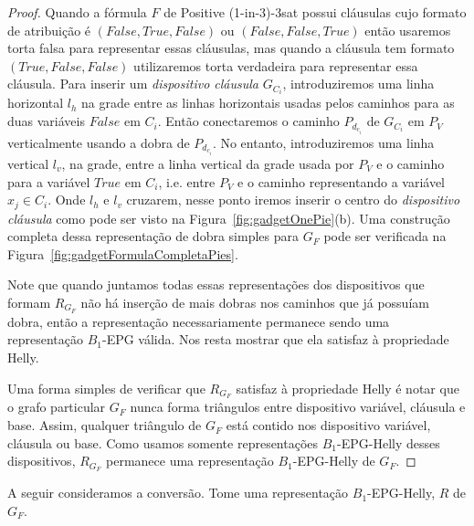 \begin{proof}
Quando a fórmula  $F$ de {\sc Positive (1-in-3)-3sat} possui cláusulas cujo formato de atribuição é $(False, True, False)$ ou $(False, False, True)$ então usaremos torta falsa para representar essas cláusulas, mas quando a cláusula tem formato  $(True, False, False)$ utilizaremos  torta verdadeira para representar essa cláusula. Para inserir um  \textit{ dispositivo cláusula} $G_{C_i}$, introduziremos uma linha horizontal $l_{h}$ na grade entre as linhas horizontais usadas pelos caminhos para as duas variáveis $False$ em $ C_i $. Então conectaremos o caminho $P_{d_{c_i}}$ de $G_{C_i}$ em $P_{V}$ verticalmente usando a dobra de  $P_{d_{c_i}}$. No entanto, introduziremos uma linha vertical $ l_{v}$, na grade, entre a linha vertical da grade usada por $P_{V}$ e o caminho para  a variável $True$ em $C_i$, i.e. entre $P_{V}$ e o caminho representando a variável  $x_j \in C_i$. Onde  $l_{h}$  e $l_{v}$ cruzarem, nesse ponto iremos inserir o centro do  \textit{dispositivo cláusula} como pode ser visto na Figura~\ref{fig:gadgetOnePie}(b). Uma construção completa dessa representação de dobra simples para  $G_F$ pode ser verificada na 
Figura~\ref{fig:gadgetFormulaCompletaPies}.%

\begin{landscape}

\end{landscape}





Note que quando juntamos todas essas representações  dos  dispositivos que formam $ R_{G_F} $ não há inserção de mais dobras nos caminhos que já possuíam dobra, então a representação necessariamente permanece sendo uma representação  $ B_1$-EPG válida. Nos resta mostrar que ela satisfaz à propriedade Helly. 

Uma forma simples de verificar que $ R_{G_F} $ satisfaz à propriedade Helly é notar que o grafo particular  $G_F$ nunca forma triângulos entre dispositivo variável, cláusula e base. Assim, qualquer triângulo de  $G_F$ está contido nos dispositivo variável, cláusula ou base. Como usamos somente representações  $B_1$-EPG-Helly desses dispositivos, $ R_{G_F} $ permanece uma representação $B_1$-EPG-Helly de $G_F$.
 \end{proof}


A seguir consideramos a conversão. Tome uma representação $B_1$-EPG-Helly, $R$ de $G_F$.

